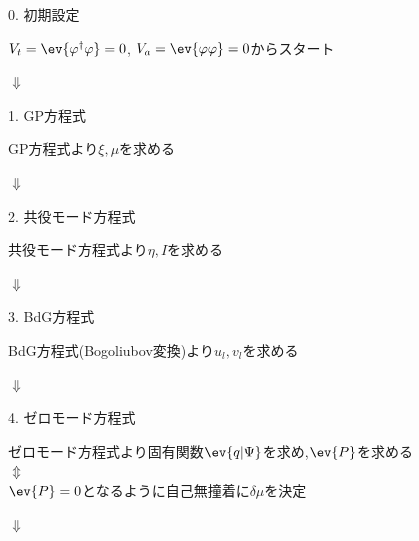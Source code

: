 \documentclass[10.5pt,a4paper]{jreport}
\begin{document}
\begin{itembox}[c]{0. 初期設定}
  \begin{center}
    $V_t = \ev{\varphi^{\dagger}\varphi} = 0$, $V_a = \ev{\varphi\varphi} = 0$からスタート
  \end{center}
\end{itembox}

\begin{center}
  $\Downarrow$
\end{center}

\begin{itembox}[c]{1. GP方程式}
  \begin{center}
    GP方程式より$\xi, \mu $を求める
  \end{center}
\end{itembox}

\begin{center}
  $\Downarrow$
\end{center}

\begin{itembox}[c]{2. 共役モード方程式}
  \begin{center}
    共役モード方程式より$\eta, I$を求める
  \end{center}
\end{itembox}

\begin{center}
  $\Downarrow$
\end{center}

\begin{itembox}[c]{3. BdG方程式}
  \begin{center}
    BdG方程式(Bogoliubov変換)より$u_l, v_l$を求める
  \end{center}
\end{itembox}

\begin{center}
  $\Downarrow$
\end{center}

\begin{itembox}[c]{4. ゼロモード方程式}
  \begin{center}
    ゼロモード方程式より固有関数$\ev{q|\Psi}$を求め,$\ev{P}$を求める\\
    $\Updownarrow$\\
    $\ev{P} = 0$となるように自己無撞着に$\delta\mu$を決定
  \end{center}
\end{itembox}

\begin{center}
  $\Downarrow$
\end{center}
\end{document}
